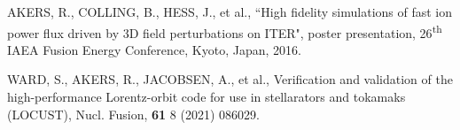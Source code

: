 \documentclass[10pt, a4paper, twoside]{article}
\begin{document}
\begin{thebibliography}{9}
    AKERS, R., COLLING, B., HESS, J., et al.,
    ``High fidelity simulations of fast ion power flux driven by 3D field perturbations on ITER",
    poster presentation, 
    26\textsuperscript{th} IAEA Fusion Energy Conference,
    Kyoto, Japan, 
    2016.

    WARD, S., AKERS, R., JACOBSEN, A., et al.,
    Verification and validation of the high-performance Lorentz-orbit code for use in stellarators and tokamaks (LOCUST),
    Nucl. Fusion,
    \textbf{61} 8
    (2021)
    086029.






\end{thebibliography}
\end{document}
